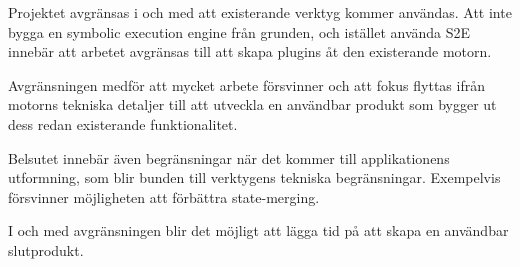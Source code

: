 Projektet avgränsas i och med att existerande verktyg kommer användas. Att 
inte bygga en symbolic execution engine från grunden, och istället använda 
S2E innebär att arbetet avgränsas till att skapa plugins åt den existerande 
motorn. 

Avgränsningen medför att mycket arbete försvinner och att fokus flyttas 
ifrån motorns tekniska detaljer till att utveckla en användbar produkt som 
bygger ut dess redan existerande funktionalitet.

Belsutet innebär även begränsningar när det kommer till applikationens 
utformning, som blir bunden till verktygens tekniska begränsningar. 
Exempelvis försvinner möjligheten att förbättra state-merging. 

I och med avgränsningen blir det möjligt att lägga tid på att skapa en 
användbar slutprodukt.


